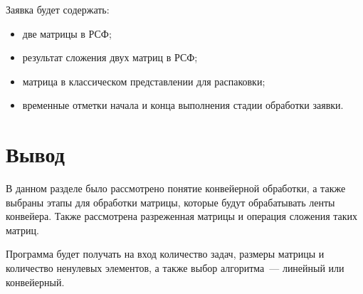 Заявка будет содержать:
\begin{itemize}
	\item две матрицы в РСФ;
	\item результат сложения двух матриц в РСФ;
	\item матрица в классическом представлении для распаковки;
	\item временные отметки начала и конца выполнения стадии обработки заявки.
\end{itemize}

\section*{Вывод}
В данном разделе было рассмотрено понятие конвейерной обработки, а также выбраны этапы для обработки матрицы, которые будут обрабатывать ленты конвейера.
Также рассмотрена разреженная матрицы и операция сложения таких матриц.

Программа будет получать на вход количество задач, размеры матрицы и количество ненулевых элементов, а также выбор алгоритма~--- линейный или конвейерный.